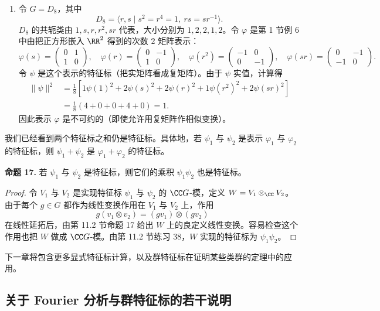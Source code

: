 \begin{enumerate}[label=(\arabic*)]
  \item 令 $G=D_8$，其中
  \[
    D_8=\langle r,s\mid s^2=r^4=1,
    \ rs=sr^{-1}\rangle.
  \]
  $D_8$ 的共轭类由 $1,s,r,r^2,sr$ 代表，大小分别为 $1,2,2,1,2$。令 $\varphi$ 是第 1 节例 6 中由把正方形嵌入 $\RR^2$ 得到的次数 $2$ 矩阵表示：
  \[
    \varphi(s)=\begin{pmatrix}0&1\\1&0\end{pmatrix},
    \quad
    \varphi(r)=\begin{pmatrix}0&-1\\1&0\end{pmatrix},
    \quad
    \varphi(r^2)=\begin{pmatrix}-1&0\\0&-1\end{pmatrix},
    \quad
    \varphi(sr)=\begin{pmatrix}0&-1\\-1&0\end{pmatrix}.
  \]
  令 $\psi$ 是这个表示的特征标（把实矩阵看成复矩阵）。由于 $\psi$ 实值，计算得
  \[
  \begin{aligned}
    \|\psi\|^2
    &=\frac18[1\psi(1)^2+2\psi(s)^2+2\psi(r)^2+1\psi(r^2)^2+2\psi(sr)^2]\\
    &=\frac18(4+0+0+4+0)=1.
  \end{aligned}
  \]
  因此表示 $\varphi$ 是不可约的（即使允许用复矩阵作相似变换）。
\end{enumerate}

我们已经看到两个特征标之和仍是特征标。具体地，若 $\psi_1$ 与 $\psi_2$ 是表示 $\varphi_1$ 与 $\varphi_2$ 的特征标，则 $\psi_1+\psi_2$ 是 $\varphi_1+\varphi_2$ 的特征标。

\medskip
\noindent\textbf{命题 17.} 若 $\psi_1$ 与 $\psi_2$ 是特征标，则它们的乘积 $\psi_1\psi_2$ 也是特征标。

\begin{proof}
令 $V_1$ 与 $V_2$ 是实现特征标 $\psi_1$ 与 $\psi_2$ 的 $\CC G$-模，定义 $W=V_1\otimes_{\CC}V_2$。由于每个 $g\in G$ 都作为线性变换作用在 $V_1$ 与 $V_2$ 上，作用
\[
  g(v_1\otimes v_2)=(gv_1)\otimes(gv_2)
\]
在线性延拓后，由第 11.2 节命题 17 给出 $W$ 上的良定义线性变换。容易检查这个作用也把 $W$ 做成 $\CC G$-模。由第 11.2 节练习 38，$W$ 实现的特征标为 $\psi_1\psi_2$。
\end{proof}

下一章将包含更多显式特征标计算，以及群特征标在证明某些类群的定理中的应用。

\subsection*{关于 Fourier 分析与群特征标的若干说明}

